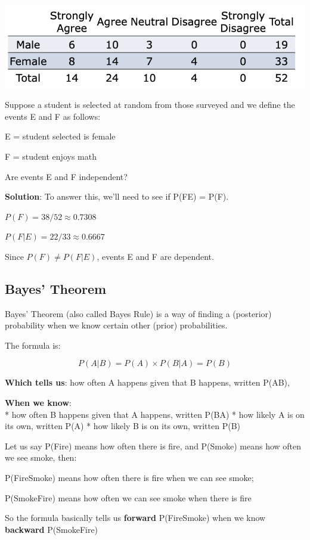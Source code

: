 \documentclass[
]{book}
\begin{document}
\begin{center}\includegraphics[width=0.45\linewidth]{topic01/checkingIndep} \end{center}

Suppose a student is selected at random from those surveyed and we define the events E and F as follows:

E = student selected is female

F = student enjoys math

Are events E and F independent?

\textbf{Solution}: To answer this, we'll need to see if P(F\textbar E) = P(F).

\(P(F) = 38/52 \approx 0.7308\)

\(P(F|E) = 22/33 \approx 0.6667\)

Since \(P(F) \ne P(F|E)\), events E and F are dependent.

\hypertarget{bayes-theorem}{%
\subsection{Bayes' Theorem}\label{bayes-theorem}}

Bayes' Theorem (also called Bayes Rule) is a way of finding a (posterior) probability when we know certain other (prior) probabilities.

The formula is:

\[P(A|B) =  P(A) \times P(B|A) = P(B)\]

\textbf{Which tells us}: how often A happens given that B happens, written P(A\textbar B),

\textbf{When we know}:\\
* how often B happens given that A happens, written P(B\textbar A)
* how likely A is on its own, written P(A)
* how likely B is on its own, written P(B)

Let us say P(Fire) means how often there is fire, and P(Smoke) means how often we see smoke, then:

P(Fire\textbar Smoke) means how often there is fire when we can see smoke;

P(Smoke\textbar Fire) means how often we can see smoke when there is fire

So the formula basically tells us \textbf{forward} P(Fire\textbar Smoke) when we know \textbf{backward} P(Smoke\textbar Fire)
\end{document}
